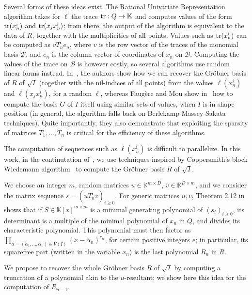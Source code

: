 \documentclass[12pt]{article}
\begin{document}
Several forms of these ideas exist. The Rational Univariate
Representation algorithm takes for $\ell$ the trace ${\rm tr}: Q \to
\mathbb{K}$ and computes values of the form ${\rm tr}(x_n^i)$ and
${\rm tr}(x_j x_n^i)$; from there, the output of the algorithm is
equivalent to the data of $R$, together with the multiplicities of all
points. Values such as ${\rm tr}(x_n^i)$ can be computed as $v T_n^i
e_n$, where $v$ is the row vector of the traces of the monomial basis
$\mathscr{B}$, and $e_n$ is the column vector of coordinates of $x_n$ on
$\mathscr{B}$. Computing the values of the trace on $\mathscr{B}$ is
however costly, so several algorithms use random linear forms
instead. In~\cite{BoSaSc03}, the authors show how we can recover the
Gr\"obner basis of $R$ of $\sqrt{I}$ (together with the nil-indices of
all points) from the values $\ell(x_n^i)$ and $\ell(x_j x_n^i)$, for a
random $\ell$, whereas Faug\`ere and Mou show in~\cite{FaMo17} how to
compute the basis $G$ of $I$ itself using similar sets of values, when
$I$ is in shape position (in general, the algorithm falls back on
Berlekamp-Massey-Sakata techniques). Quite importantly, they also
demonstrate that exploiting the sparsity of matrices $T_1,\dots,T_n$
is critical for the efficiency of these algorithms.

The computation of sequences such as $\ell(x_n^i)$ is difficult to
parallelize.  In this work, in the continutation of~\cite{BoSaSc03},
we use techniques inspired by Coppersmith's block Wiedemann
algorithm~\cite{Coppersmith93} to compute the Gr\"obner basis $R$ of
$\sqrt{I}$.

 We choose an integer $m$, random
matrices $u \in \mathbb{K}^{m \times D}$, $v \in \mathbb{K}^{D \times
  m}$, and we consider the matrix sequence $s = (uT_n^iv)_{i \ge
  0}$. For generic matrices $u, v$, Theorem 2.12 in~\cite{KaVi04}
shows that if $S \in \mathbb{K}[x]^{m\times m}$ is a minimal
generating polynomial of $(s_i)_{i \ge 0}$, its determinant is a
multiple of the minimal polynomial of $x_n$ in $Q$, and divides its
characteristic polynomial. This polynomial must then factor as
$\prod_{\alpha=(\alpha_1,\dots,\alpha_n) \in V(I)}
(x-\alpha_n)^{e_\alpha}$, for certain positive integers $e$; in
particular, its squarefree part (written in the variable $x_n$) is the last polynomial $R_n$ in $R$.

\medskip{} We propose  to recover the 
whole Gr\"obner basis $R$ of $\sqrt{I}$ by computing a truncation of
a polynomial akin to the $u$-resultant; we show here this idea for the computation
of $R_{n-1}$.
\end{document}
